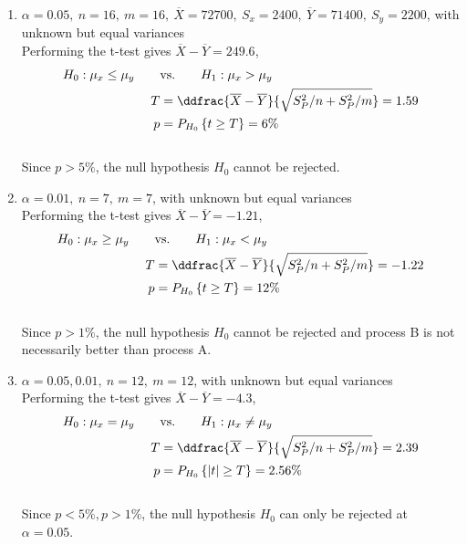 \begin{enumerate}
	\item $\alpha = 0.05,\ n = 16,\ m = 16,\ \overline{X} = 72700,\ S_x = 2400,\ \overline{Y} = 71400,\ S_y = 2200$, with unknown but equal variances\\
	Performing the t-test gives $ \overline{X} - \overline{Y} = 249.6 $,\\
	
	\begin{align}
		H_0 : \mu_x \leq \mu_y \qquad &\text{vs.} \qquad H_1 : \mu_x > \mu_y \nonumber \\
		T &= \ddfrac{ \overline{X} - \overline{Y} }{\sqrt{S_P^2/n + S_P^2/m}} = 1.59 \nonumber \\
		p &= P_{H_0}\left\{t \geq T\right\} = 6\% 
	\end{align}\\
	Since $ p > 5\% $, the null hypothesis $ H_0 $ cannot be rejected.\\
	
	\item $\alpha = 0.01,\ n = 7,\ m = 7$, with unknown but equal variances\\
	Performing the t-test gives $ \overline{X} - \overline{Y} = -1.21 $,\\
	
	\begin{align}
		H_0 : \mu_x \geq \mu_y \qquad &\text{vs.} \qquad H_1 : \mu_x < \mu_y \nonumber \\
		T &= \ddfrac{ \overline{X} - \overline{Y} }{\sqrt{S_P^2/n + S_P^2/m}} = -1.22 \nonumber \\
		p &= P_{H_0}\left\{t \geq T\right\} = 12\% 
	\end{align}\\
	Since $ p > 1\% $, the null hypothesis $ H_0 $ cannot be rejected and process B is not necessarily better than process A.\\
	
	\item $\alpha = 0.05, 0.01,\ n = 12,\ m = 12$, with unknown but equal variances\\
	Performing the t-test gives $ \overline{X} - \overline{Y} = -4.3 $,\\
	
	\begin{align}
		H_0 : \mu_x = \mu_y \qquad &\text{vs.} \qquad H_1 : \mu_x \neq \mu_y \nonumber \\
		T &= \ddfrac{ \overline{X} - \overline{Y} }{\sqrt{S_P^2/n + S_P^2/m}} = 2.39 \nonumber \\
		p &= P_{H_0}\left\{|t| \geq T\right\} = 2.56\% 
	\end{align}\\
	Since $ p < 5\%, p > 1\% $, the null hypothesis $ H_0 $ can only be rejected at $ \alpha = 0.05 $.\\
	

\end{enumerate}
